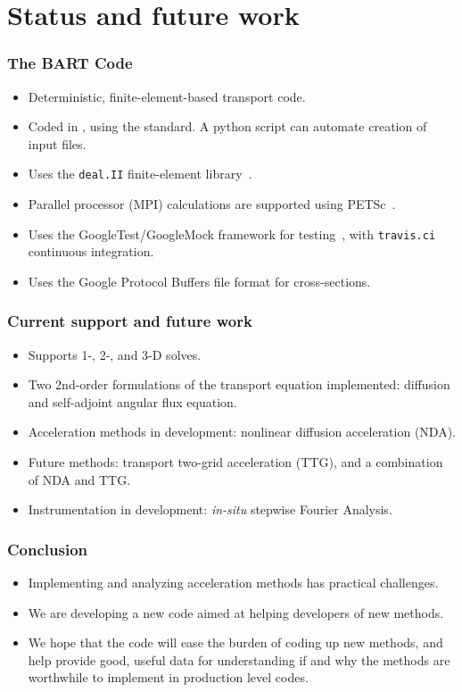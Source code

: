 \documentclass[xcolor=x11names, compress]{beamer}
\begin{document}
\section{Status and future work}
\begin{frame}
  \frametitle{The BART Code}
  \begin{itemize}[<+->]
  \item Deterministic, finite-element-based transport code.
  \item Coded in \Cpp{}, using the \Cpp[17] standard. A python script can
    automate creation of input files.
  \item Uses the \texttt{deal.II} finite-element library~\cite{dealII90}.
  \item Parallel processor (MPI) calculations are supported using
    PETSc~\cite{petsc-web-page, petsc-user-ref, petsc-efficient}.
  \item Uses the GoogleTest/GoogleMock framework for testing~\cite{googletest}, with
    \texttt{travis.ci} continuous integration.
  \item Uses the Google Protocol Buffers file format for cross-sections.
  \end{itemize}
\end{frame}

\begin{frame}
  \frametitle{Current support and future work}
  \begin{itemize}[<+->]    
  \item Supports 1-, 2-, and 3-D solves.
  \item Two 2nd-order formulations of the transport equation
    implemented: diffusion and self-adjoint angular flux equation.
  \item Acceleration methods in development: nonlinear diffusion
    acceleration (NDA).
  \item Future methods: transport two-grid acceleration (TTG), and a
    combination of NDA and TTG.
  \item Instrumentation in development: \textit{in-situ} stepwise Fourier Analysis.
  \end{itemize}
\end{frame}

\begin{frame}
  \frametitle{Conclusion}
  \pause
  \begin{itemize}[<+->]
  \item Implementing and analyzing acceleration methods has practical
    challenges.
  \item We are developing a new code aimed at helping developers of
    new methods.
  \item We hope that the code will ease the burden of coding up new
    methods, and help provide good, useful data for understanding if
    and why the methods are worthwhile to implement in production
    level codes.
  \end{itemize}
\end{frame}
\end{document}
